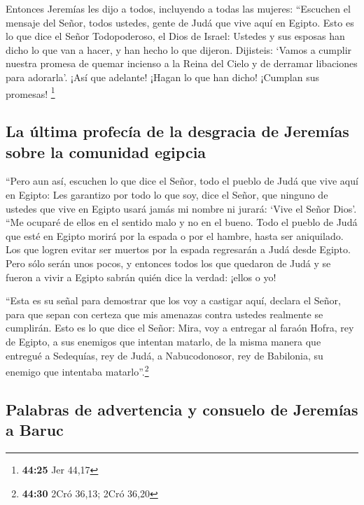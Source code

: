  Entonces Jeremías les dijo a todos, incluyendo a todas
las mujeres: ``Escuchen el mensaje del Señor, todos ustedes, gente de
Judá que vive aquí en Egipto.  Esto es lo que dice el
Señor Todopoderoso, el Dios de Israel: Ustedes y sus esposas han dicho
lo que van a hacer, y han hecho lo que dijeron. Dijisteis: `Vamos a
cumplir nuestra promesa de quemar incienso a la Reina del Cielo y de
derramar libaciones para adorarla'. ¡Así que adelante! ¡Hagan lo que han
dicho! ¡Cumplan sus promesas! \footnote{\textbf{44:25} Jer 44,17}

\hypertarget{la-uxfaltima-profecuxeda-de-la-desgracia-de-jeremuxedas-sobre-la-comunidad-egipcia}{%
\subsection{La última profecía de la desgracia de Jeremías sobre la
comunidad
egipcia}\label{la-uxfaltima-profecuxeda-de-la-desgracia-de-jeremuxedas-sobre-la-comunidad-egipcia}}

 ``Pero aun así, escuchen lo que dice el Señor, todo el
pueblo de Judá que vive aquí en Egipto: Les garantizo por todo lo que
soy, dice el Señor, que ninguno de ustedes que vive en Egipto usará
jamás mi nombre ni jurará: `Vive el Señor Dios'.  ``Me
ocuparé de ellos en el sentido malo y no en el bueno. Todo el pueblo de
Judá que esté en Egipto morirá por la espada o por el hambre, hasta ser
aniquilado.  Los que logren evitar ser muertos por la
espada regresarán a Judá desde Egipto. Pero sólo serán unos pocos, y
entonces todos los que quedaron de Judá y se fueron a vivir a Egipto
sabrán quién dice la verdad: ¡ellos o yo!

 ``Esta es su señal para demostrar que los voy a castigar
aquí, declara el Señor, para que sepan con certeza que mis amenazas
contra ustedes realmente se cumplirán.  Esto es lo que
dice el Señor: Mira, voy a entregar al faraón Hofra, rey de Egipto, a
sus enemigos que intentan matarlo, de la misma manera que entregué a
Sedequías, rey de Judá, a Nabucodonosor, rey de Babilonia, su enemigo
que intentaba matarlo''.\footnote{\textbf{44:30} 2Cró 36,13; 2Cró 36,20}

\hypertarget{palabras-de-advertencia-y-consuelo-de-jeremuxedas-a-baruc}{%
\subsection{Palabras de advertencia y consuelo de Jeremías a
Baruc}\label{palabras-de-advertencia-y-consuelo-de-jeremuxedas-a-baruc}}

